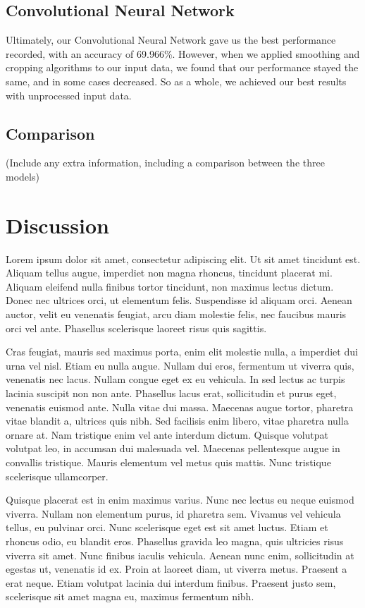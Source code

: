 \documentclass[conference]{IEEEtran}
\begin{document}
\subsection{Convolutional Neural Network}

Ultimately, our Convolutional Neural Network gave us the best performance recorded, with an accuracy of 69.966\%. However, when we applied smoothing and cropping algorithms to our input data, we found that our performance stayed the same, and in some cases decreased. So as a whole, we achieved our best results with unprocessed input data.

\subsection{Comparison}
(Include any extra information, including a comparison between the three models)

\section{Discussion}

Lorem ipsum dolor sit amet, consectetur adipiscing elit. Ut sit amet tincidunt est. Aliquam tellus augue, imperdiet non magna rhoncus, tincidunt placerat mi. Aliquam eleifend nulla finibus tortor tincidunt, non maximus lectus dictum. Donec nec ultrices orci, ut elementum felis. Suspendisse id aliquam orci. Aenean auctor, velit eu venenatis feugiat, arcu diam molestie felis, nec faucibus mauris orci vel ante. Phasellus scelerisque laoreet risus quis sagittis.

Cras feugiat, mauris sed maximus porta, enim elit molestie nulla, a imperdiet dui urna vel nisl. Etiam eu nulla augue. Nullam dui eros, fermentum ut viverra quis, venenatis nec lacus. Nullam congue eget ex eu vehicula. In sed lectus ac turpis lacinia suscipit non non ante. Phasellus lacus erat, sollicitudin et purus eget, venenatis euismod ante. Nulla vitae dui massa. Maecenas augue tortor, pharetra vitae blandit a, ultrices quis nibh. Sed facilisis enim libero, vitae pharetra nulla ornare at. Nam tristique enim vel ante interdum dictum. Quisque volutpat volutpat leo, in accumsan dui malesuada vel. Maecenas pellentesque augue in convallis tristique. Mauris elementum vel metus quis mattis. Nunc tristique scelerisque ullamcorper.

Quisque placerat est in enim maximus varius. Nunc nec lectus eu neque euismod viverra. Nullam non elementum purus, id pharetra sem. Vivamus vel vehicula tellus, eu pulvinar orci. Nunc scelerisque eget est sit amet luctus. Etiam et rhoncus odio, eu blandit eros. Phasellus gravida leo magna, quis ultricies risus viverra sit amet. Nunc finibus iaculis vehicula. Aenean nunc enim, sollicitudin at egestas ut, venenatis id ex. Proin at laoreet diam, ut viverra metus. Praesent a erat neque. Etiam volutpat lacinia dui interdum finibus. Praesent justo sem, scelerisque sit amet magna eu, maximus fermentum nibh.
\end{document}
